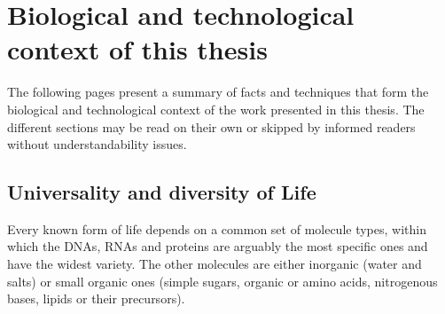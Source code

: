 \chapter{Biological and technological context of this thesis}%
\label{ch:background}

\begin{comment}
\setlength{\epigraphwidth}{0.6\textwidth}
\epigraphhead[70]{%
    \epigraph{It would probably be oversimplifying the
    matter,\\but I am strongly tempted to say,\\
    \textquote{All life is nucleic acid; the rest is
    commentary}.}{\citet{asimov:WrongRel}}%
}
\end{comment}

\vspace{-1mm}
The following pages present a summary of facts and techniques
that form the biological and technological context
of the work presented in this thesis.
The different sections may be read on their own
or skipped by informed readers without understandability issues.

\begin{comment}
\Rough{%
expected and reported correlation between transcripts and proteins
Measuring protein expression by MS, data analysis – spectral counts, top 3, etc,
available large scale datasets on human tissues
The problem of comparing and integrating independent datasets, EBI’s GXA \\ \\
key concepts: DNA storage, RNA transfert of information and regulation,
protein effectors ==\textgreater phenotype.\\ \\
%
Do not forget the (tissues) specifications and the structural functions. =\textgreater Embryology.\\ \\
}
\end{comment}

\vspace{-1mm}
\section{Universality and diversity of Life}\label{sec:bio}
\vspace{-1mm}

Every known form of life depends on a common set of molecule types,
within which the \glspl{DNA}, \glspl{RNA} and proteins
are arguably the most specific ones and have the widest variety.
The other molecules are either inorganic (water and salts)
or small organic ones (simple sugars, organic or amino acids,
nitrogenous bases, lipids or their precursors).~

